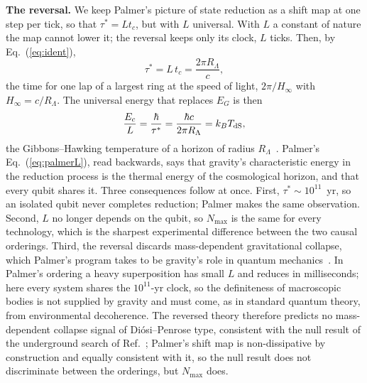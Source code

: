 \documentclass[aps,prd,twocolumn,superscriptaddress,nofootinbib,showkeys]{revtex4-2}
\newcommand{\tc}{t_c}
\newcommand{\Ec}{E_c}
\newcommand{\RL}{R_\Lambda}
\begin{document}
\textbf{The reversal.} We keep Palmer's picture of state reduction as a shift map at one step per tick, so that $\tau^* = L\tc$, but with $L$ universal. With $L$ a constant of nature the map cannot lower it; the reversal keeps only its clock, $L$ ticks. Then, by Eq.~(\ref{eq:ident}),
\begin{equation}
\tau^* = L\,\tc = \frac{2\pi\RL}{c} ,
\label{eq:clock}
\end{equation}
the time for one lap of a largest ring at the speed of light, $2\pi/H_\infty$ with $H_\infty = c/\RL$. The universal energy that replaces $E_G$ is then
\begin{equation}
\frac{\Ec}{L} = \frac{\hbar}{\tau^*} = \frac{\hbar c}{2\pi\RL} = k_B T_{\rm dS},
\label{eq:energy}
\end{equation}
the Gibbons--Hawking temperature of a horizon of radius $\RL$~\cite{gibbons1977}. Palmer's Eq.~(\ref{eq:palmerL}), read backwards, says that gravity's characteristic energy in the reduction process is the thermal energy of the cosmological horizon, and that every qubit shares it. Three consequences follow at once. First, $\tau^*\sim10^{11}$~yr, so an isolated qubit never completes reduction; Palmer makes the same observation. Second, $L$ no longer depends on the qubit, so $N_{\max}$ is the same for every technology, which is the sharpest experimental difference between the two causal orderings. Third, the reversal discards mass-dependent gravitational collapse, which Palmer's program takes to be gravity's role in quantum mechanics~\cite{palmer2016,hance2025}. In Palmer's ordering a heavy superposition has small $L$ and reduces in milliseconds; here every system shares the $10^{11}$-yr clock, so the definiteness of macroscopic bodies is not supplied by gravity and must come, as in standard quantum theory, from environmental decoherence. The reversed theory therefore predicts no mass-dependent collapse signal of Di\'osi--Penrose type, consistent with the null result of the underground search of Ref.~\cite{donadi2021}; Palmer's shift map is non-dissipative by construction and equally consistent with it, so the null result does not discriminate between the orderings, but $N_{\max}$ does.
\end{document}
